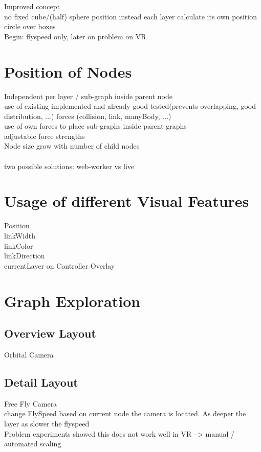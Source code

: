 Improved concept \\
no fixed cube/(half) sphere position instead each layer calculate its own position \\
circle over boxes \\
Begin: flyspeed only, later on problem on VR \\

\section{Position of Nodes}

Independent per layer / sub-graph inside parent node \\
use of existing implemented and already good tested(prevents overlapping, good distribution, ...) forces (collision, link, manyBody, ...) \\
use of own forces to place sub-graphs inside parent graphs \\
adjustable force strengths \\
Node size grow with number of child nodes \\
\\
two possible solutions: web-worker vs live \\

\section{Usage of different Visual Features}

Position \\
linkWidth \\
linkColor \\
linkDirection \\ 
currentLayer on Controller Overlay \\ 

\section{Graph Exploration}

\subsection{Overview Layout}
Orbital Camera

\subsection{Detail Layout}
Free Fly Camera \\
change FlySpeed based on current node the camera is located. As deeper the layer as slower the flyspeed \\
Problem experiments showed this does not work well in VR --> manual / automated scaling. \\

